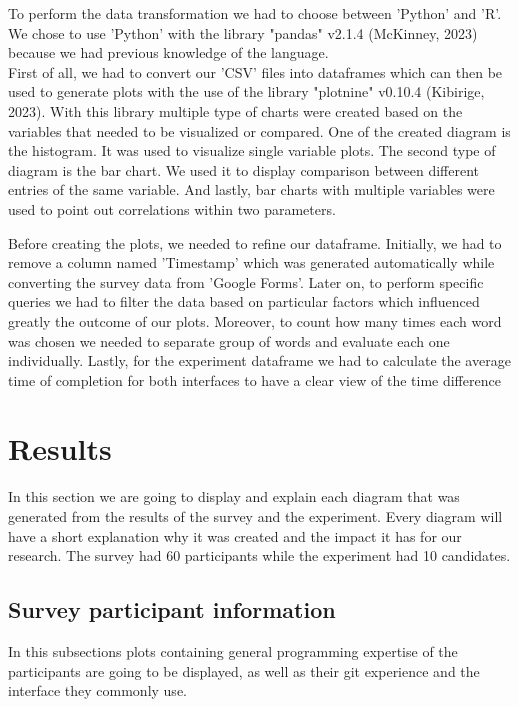 \documentclass[]{report}
\begin{document}
	To perform the data transformation we had to choose between 'Python' and 'R'. We chose to use 'Python' with the library "pandas" v2.1.4 (McKinney, 2023) because we had previous knowledge of the language. \\
	
	First of all, we had to convert our 'CSV' files into dataframes which can then be used to generate plots with the use of the library "plotnine" v0.10.4 (Kibirige, 2023).  With this library multiple type of charts were created based on the variables that needed to be visualized or compared. One of the created diagram is the histogram. It was used to visualize single variable plots. The second type of diagram is the bar chart. We used it to display comparison between different entries of the same variable. And lastly, bar charts with multiple variables were used to point out correlations within two parameters.
	
	Before creating the plots, we needed to refine our dataframe. Initially, we had to remove a column named 'Timestamp' which was generated automatically while converting the survey data from 'Google Forms'. Later on, to perform specific queries we had to filter the data based on particular factors which influenced greatly the outcome of our plots. Moreover, to count how many times each word was chosen we needed to separate group of words and evaluate each one individually. Lastly, for the experiment dataframe we had to calculate the average time of completion for both interfaces to have a clear view of the time difference
	\section{Results}
	In this section we are going to display and explain each diagram that was generated from the results of the survey and the experiment. Every diagram will have a short explanation why it was created and the impact it has for our research. The survey had 60 participants while the experiment had 10 candidates. 
	
	\subsection{Survey participant information}

	In this subsections plots containing general programming expertise of the participants are going to be displayed, as well as their git experience and the interface they commonly use.\\
	
\end{document}
